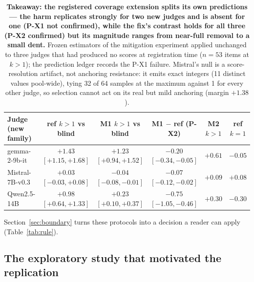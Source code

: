 \documentclass[11pt]{article}
\begin{document}
\begin{table}[tbp]
\centering
\footnotesize
\setlength{\tabcolsep}{3pt}
\begin{tabular}{lccccc}
\toprule
Judge (new family) & ref $k{>}1$ vs blind & M1 $k{>}1$ vs blind & M1 $-$ ref (P-X2) & M2 $k{>}1$ & ref $k{=}1$ \\
\midrule
gemma-2-9b-it & $+1.43$ {\scriptsize$[+1.15,+1.68]$} & $+1.23$ {\scriptsize$[+0.94,+1.52]$} & $-0.20$ {\scriptsize$[-0.34,-0.05]$} & $+0.61$ & $-0.05$ \\
Mistral-7B-v0.3 & $+0.03$ {\scriptsize$[-0.03,+0.08]$} & $-0.04$ {\scriptsize$[-0.08,-0.01]$} & $-0.07$ {\scriptsize$[-0.12,-0.02]$} & $+0.09$ & $+0.08$ \\
Qwen2.5-14B & $+0.98$ {\scriptsize$[+0.64,+1.33]$} & $+0.23$ {\scriptsize$[+0.10,+0.37]$} & $-0.75$ {\scriptsize$[-1.05,-0.46]$} & $+0.30$ & $-0.30$ \\
\bottomrule
\end{tabular}
\caption{\textbf{Takeaway: the registered coverage extension splits its own predictions — the harm replicates strongly for two new judges and is absent for one (P-X1 not confirmed), while the fix's contrast holds for all three (P-X2 confirmed) but its magnitude ranges from near-full removal to a small dent.}
Frozen estimators of the mitigation experiment applied unchanged to three judges that had produced no scores at registration time ($n{=}53$ items at $k{>}1$); the prediction ledger records the P-X1 failure. Mistral's null is a score-resolution artifact, not anchoring resistance: it emits exact integers (11 distinct values pool-wide), tying 32 of 64 samples at the maximum against 1 for every other judge, so selection cannot act on its real but mild anchoring (margin $+1.38$).}
\label{tab:coverage}
\end{table}

Section~\ref{sec:boundary} turns these protocols into a decision a reader can apply (Table~\ref{tab:rule}).

\FloatBarrier
\subsection{The exploratory study that motivated the replication}
\label{sec:ties}
\end{document}

